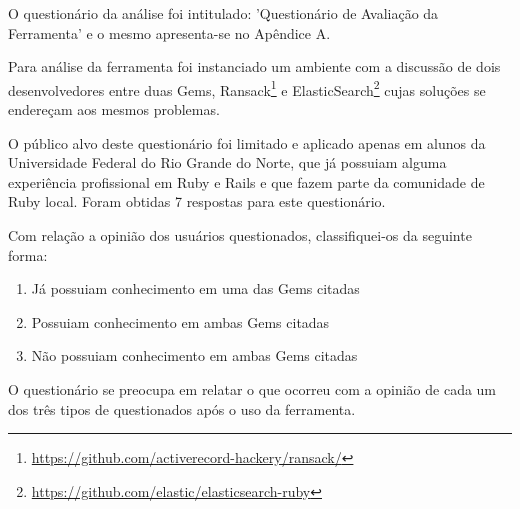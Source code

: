 O questionário da análise foi intitulado: 'Questionário de Avaliação da Ferramenta' e o mesmo apresenta-se no Apêndice A.

Para análise da ferramenta foi instanciado um ambiente com a discussão de dois desenvolvedores entre duas Gems, Ransack\footnote{\url{https://github.com/activerecord-hackery/ransack/}} e ElasticSearch\footnote{\url{https://github.com/elastic/elasticsearch-ruby}} cujas soluções se endereçam aos mesmos problemas.

O público alvo deste questionário foi limitado e aplicado apenas em alunos da Universidade Federal do Rio Grande do Norte, que já possuiam alguma experiência profissional em Ruby e Rails e que fazem parte da comunidade de Ruby local. Foram obtidas 7 respostas para este questionário.

Com relação a opinião dos usuários questionados, classifiquei-os da seguinte forma:

\begin{enumerate}

  \item Já possuiam conhecimento em uma das Gems citadas
  \item Possuiam conhecimento em ambas Gems citadas
  \item Não possuiam conhecimento em ambas Gems citadas
  
\end{enumerate}

O questionário se preocupa em relatar o que ocorreu com a opinião de cada um dos três tipos de questionados após o uso da ferramenta.
